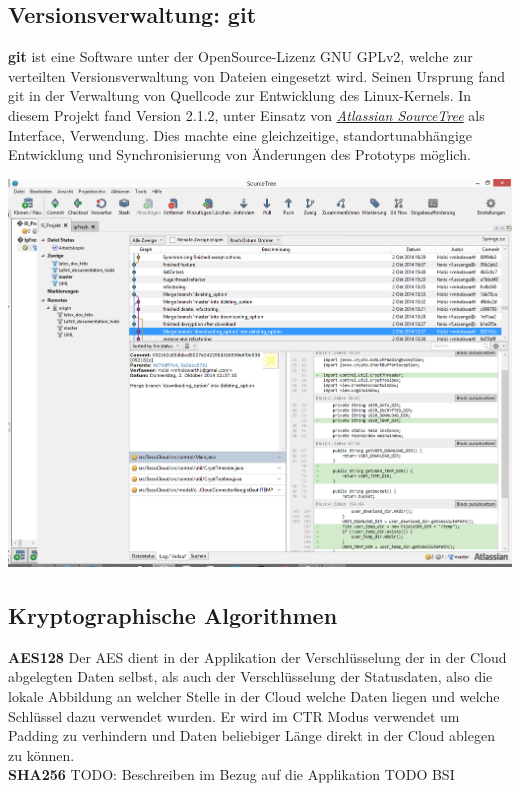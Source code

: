 \documentclass[13pt,a4paper,bibliography=totocnumbered,listof=totocnumbered]{scrartcl}
\begin{document}
\subsection{Versionsverwaltung: git}
\textbf{git} ist eine Software unter der OpenSource-Lizenz GNU GPLv2, welche zur verteilten Versionsverwaltung von Dateien eingesetzt wird. Seinen Ursprung fand git in der Verwaltung von Quellcode zur Entwicklung des Linux-Kernels. In diesem Projekt fand Version 2.1.2, unter Einsatz von \href{https://www.atlassian.com/software/sourcetree/overview}{\textit{Atlassian SourceTree}} als Interface, Verwendung. Dies machte eine gleichzeitige, standortunabhängige Entwicklung und Synchronisierung von Änderungen des Prototyps möglich.
\vspace{1em}
$\;$\\
\begin{minipage}{\linewidth}
	\centering
	\includegraphics[width=1.0\linewidth]{./img/SourceTree.png}
\end{minipage}
\vspace{1em}
  \cite{31}

\subsection{Kryptographische Algorithmen}
\textbf{AES128}
Der AES dient in der Applikation der Verschlüsselung der in der Cloud abgelegten Daten selbst, als auch der Verschlüsselung der Statusdaten, also die lokale Abbildung an welcher Stelle in der Cloud welche Daten liegen und welche Schlüssel dazu verwendet wurden. Er wird im CTR Modus verwendet um Padding zu verhindern und Daten beliebiger Länge direkt in der Cloud ablegen zu können.
\\\textbf{SHA256}
TODO: Beschreiben im Bezug auf die Applikation
TODO BSI
\end{document}
